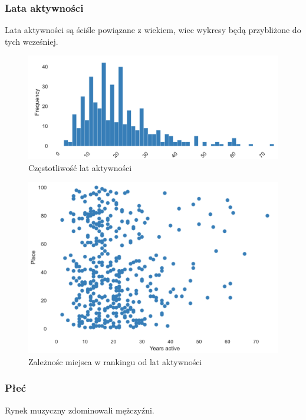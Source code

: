\documentclass[12pt, letterpaper]{article}
\begin{document}
\subsubsection{Lata aktywności}

Lata aktywności są ściśle powiązane z wiekiem, wiec wykresy będą przybliżone do tych wcześniej.

\begin{figure}[h]
    \centering
    \includegraphics[width=1\textwidth]{years_active_frequency}  
    \caption{Częstotliwość lat aktywności}
\end{figure}

\begin{figure}[h]
    \centering
    \includegraphics[width=1\textwidth]{place_years_active}  
    \caption{Zależnośc miejsca w rankingu od lat aktywności}
\end{figure}

\subsubsection{Płeć}

Rynek muzyczny zdominowali mężczyźni.
\end{document}
